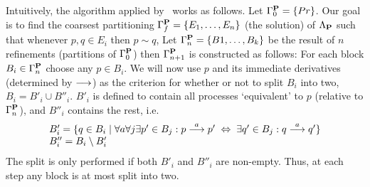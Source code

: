 \noindent
Intuitively, the algorithm applied by~\cite{VestmarOlesen} works as follows. Let $\Gamma^{\bf P}_0 =\{Pr\}$. Our goal is to find the coarsest partitioning $\Gamma^{\bf P}_f = \{E_1,\ldots,E_n\}$ (the solution) of $\Lambda_{\bf P}$ such that whenever $p,q\in E_i$ then $p\sim q$, Let $\Gamma^{\bf P}_n = \{B1,\ldots,B_k\}$ be the result of $n$ refinements (partitions of $\Gamma^{\bf P}_0$) then $\Gamma^{\bf P}_{n+1}$ is constructed as follows: For each block $B_i\in\Gamma^{\bf P}_n$ choose any $p\in B_i$. We will now use $p$ and its immediate derivatives (determined by $\stackrel{}{\longrightarrow}$) as the criterion for whether or not to split $B_i$ into two, $B_i = B'_i\cup B''_i$. $B'_i$ is defined to contain all processes `equivalent' to $p$ (relative to $\Gamma^{\bf P}_n$), and $B''_i$ contains the rest, i.e.\@
\[
\begin{array}{l}
B'_i = \{q\in B_i\mid\forall a\forall j\exists p'\in B_j: p\stackrel{a}{\longrightarrow}p'\;\Leftrightarrow\; \exists q'\in B_j:q\stackrel{a}{\longrightarrow}q'\}\\
B''_i = B_i\setminus B'_i\\
\end{array}
\]
The split is only performed if both $B'_i$ and $B''_i$ are non-empty. Thus, at each step any block is at most split into two.

